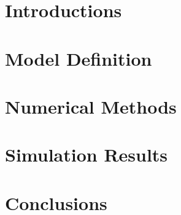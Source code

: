 \documentclass[12pt]{report}
\theoremstyle{plain}
\begin{document}



\setcounter{page}{3}
%
%
\setlength{\parskip}{0ex plus 0.5ex minus 0.2ex}

\tableofcontents
\pagebreak
\setlength{\parskip}{10pt}


\pagebreak
\pagestyle{normal}
\doublespacing

\chapter{Introductions}



\chapter{Model Definition}
%


\chapter{Numerical Methods}




\pagestyle{chp3-5} %

\chapter{Simulation Results}
\pagestyle{normal}



\chapter{Conclusions}




\newpage
\pagestyle{References}
\end{document}

